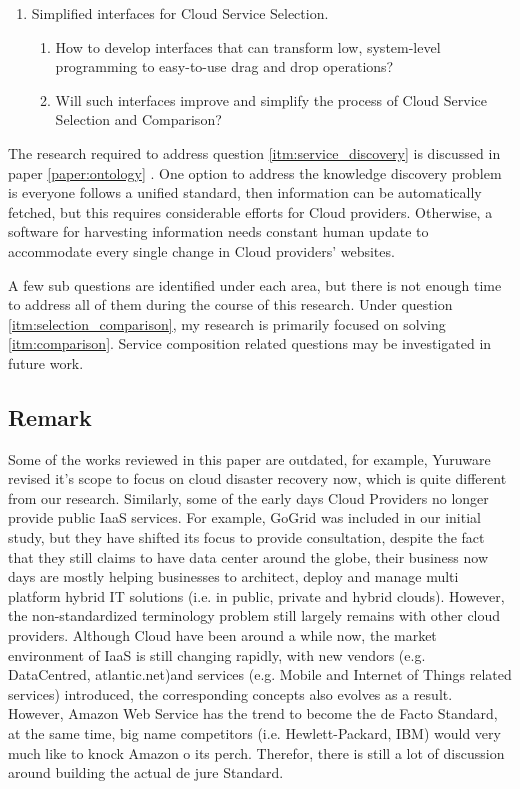 \begin{enumerate}
  \item \label{itm:interface}
  Simplified interfaces for Cloud Service Selection.
  
  \begin{enumerate}[label*=\arabic*.]
    \item How to develop interfaces that can transform low, system-level programming to easy-to-use drag and drop operations? 
    \item Will such interfaces improve and simplify the process of Cloud Service Selection and Comparison? 
  \end{enumerate} 
  
\end{enumerate}

The research required to address question \ref{itm:service_discovery} is discussed in paper \ref{paper:ontology} . One option to address the knowledge discovery problem is everyone follows a unified standard, then information can be automatically fetched, but this requires considerable efforts for Cloud providers. Otherwise, a software for harvesting information needs constant human update to accommodate every single change in Cloud providers’ websites. 

A few sub questions are identified under each area, but there is not enough time to address all of them during the course of this research. Under question \ref{itm:selection_comparison}, my research is primarily focused on solving \ref{itm:comparison}. Service composition related questions may be  investigated in future work.

\subsection{Remark}
Some  of the works reviewed in this paper are outdated, for example, Yuruware revised it's scope to focus on cloud disaster recovery now, which is quite different from our research. Similarly, some of the early days Cloud Providers no longer provide public IaaS services. For example, GoGrid was included in our initial study, but they have shifted its focus to provide consultation, despite the fact that they still claims to have data center around the globe, their business now days are mostly helping businesses to architect, deploy and manage multi platform hybrid IT solutions (i.e. in public, private and hybrid clouds). However, the non-standardized terminology problem still largely remains with other cloud providers.
Although Cloud have been around a while now, the market environment of IaaS is still changing rapidly, with new vendors (e.g. DataCentred, atlantic.net)and services (e.g. Mobile and Internet of Things related services) introduced, the corresponding concepts also evolves as a result. However, Amazon Web Service has the trend to become the de Facto Standard, at the same time, big name competitors (i.e. Hewlett-Packard, IBM) would very much like to knock Amazon o its perch. Therefor, there is still a lot of discussion around building the actual de jure Standard.

